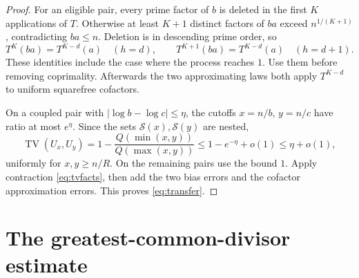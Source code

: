 \documentclass[11pt]{article}
\theoremstyle{remark}\newtheorem{remark}[theorem]{Remark}
\DeclareMathOperator{\TV}{TV}
\newcommand{\sfset}{\mathcal S}
\begin{document}
\begin{proof}
For an eligible pair, every prime factor of $b$ is deleted in the first $K$ applications of $T$. Otherwise at least $K+1$ distinct factors of $ba$ exceed $n^{1/(K+1)}$, contradicting $ba\le n$. Deletion is in descending prime order, so
\begin{equation}\label{eq:deleteidentity}
 T^K(ba)=T^{K-d}(a)\quad(h=d),\qquad
 T^{K+1}(ba)=T^{K-d}(a)\quad(h=d+1).
\end{equation}
These identities include the case where the process reaches $1$. Use them before removing coprimality. Afterwards the two approximating laws both apply $T^{K-d}$ to uniform squarefree cofactors.

On a coupled pair with $|\log b-\log c|\le\eta$, the cutoffs $x=n/b$, $y=n/c$ have ratio at most $e^\eta$. Since the sets $\sfset(x),\sfset(y)$ are nested,
\[
 \TV(U_x,U_y)=1-\frac{Q(\min(x,y))}{Q(\max(x,y))}
 \le1-e^{-\eta}+o(1)\le\eta+o(1),
\]
uniformly for $x,y\ge n/R$. On the remaining pairs use the bound $1$. Apply contraction \eqref{eq:tvfacts}, then add the two bias errors and the cofactor approximation errors. This proves \eqref{eq:transfer}.
\end{proof}

\section{The greatest-common-divisor estimate}
\end{document}
